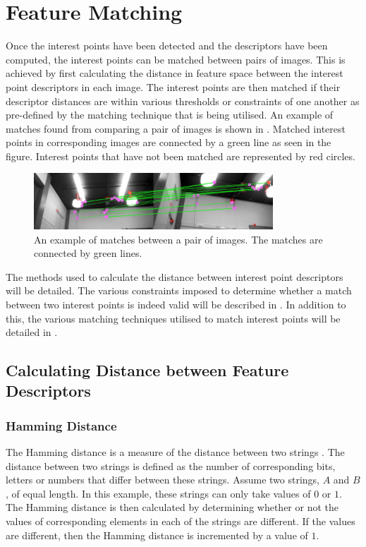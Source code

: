 \chapter{Feature Matching}
\label{sec:matching}
Once the interest points have been detected and the descriptors have been computed, the interest points can be matched between pairs of images. This is achieved by first calculating the distance in feature space between the interest point descriptors in each image. The interest points are then matched if their descriptor distances are within various thresholds or constraints of one another as pre-defined by the matching technique that is being utilised. An example of matches found from comparing a pair of images is shown in . Matched interest points in corresponding images are connected by a green line as seen in the figure. Interest points that have not been matched are represented by red circles.\\

\begin{figure}[h!] 
  \centering
    \includegraphics[width=0.8\textwidth]{../Drawings/Matching/MainRobocupDataset.jpg}
    \caption{An example of matches between a pair of images. The matches are connected by green lines.}
    \label{fig:matchesIntro}
\end{figure}

The methods used to calculate the distance between interest point descriptors will be detailed. The various constraints imposed to determine whether a match between two interest points is indeed valid will be described in . In addition to this, the various matching techniques utilised to match interest points will be detailed in .\\

\section{Calculating Distance between Feature Descriptors}
\label{sec:distance}

\subsection{Hamming Distance}
\label{sec:hamming}
The Hamming distance is a measure of the distance between two strings \citep{Banzal2007}. The distance between two strings is defined as the number of corresponding bits, letters or numbers that differ between these strings. Assume two strings, $A$ and $B$, of equal length. In this example, these strings can only take values of $0$ or $1$. The Hamming distance is then calculated by determining whether or not the values of corresponding elements in each of the strings are different. If the values are different, then the Hamming distance is incremented by a value of $1$.\\

